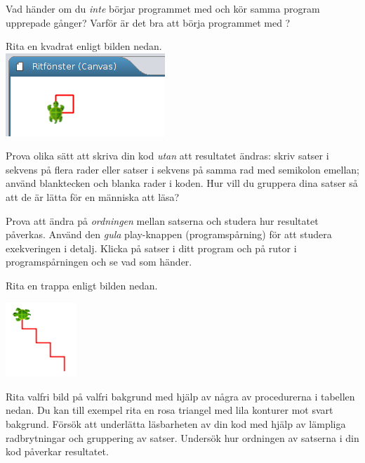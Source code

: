 \Subtask\Pen Vad händer om du \emph{inte} börjar programmet med  och kör samma program upprepade gånger? Varför är det bra att börja programmet med ?

\Subtask Rita en kvadrat enligt bilden nedan.
\vspace{1em}\\\includegraphics[width=0.45\textwidth]{../img/kojo/kvadrat}

\Subtask Prova olika sätt att skriva din kod \emph{utan} att resultatet ändras: skriv satser i sekvens på flera rader eller satser i sekvens på samma rad med semikolon emellan; använd blanktecken och blanka rader i koden. Hur vill du gruppera dina satser så att de är lätta för en människa att läsa?

\Subtask Prova att ändra på \emph{ordningen} mellan satserna och studera hur resultatet påverkas. Använd den \emph{gula} play-knappen  (programspårning) för att studera exekveringen i detalj. Klicka på satser i ditt program och på rutor i programspårningen och se vad som händer.


\Subtask Rita en trappa enligt bilden nedan.

\includegraphics[width=0.2\textwidth]{../img/kojo/stairs}

\Subtask Rita valfri bild på valfri bakgrund med hjälp av några av procedurerna i tabellen nedan. Du kan till exempel rita en rosa triangel med lila konturer mot svart bakgrund. %
Försök att underlätta läsbarheten av din kod med hjälp av lämpliga radbrytningar och gruppering av satser. Undersök hur ordningen av satserna i din kod påverkar resultatet.



